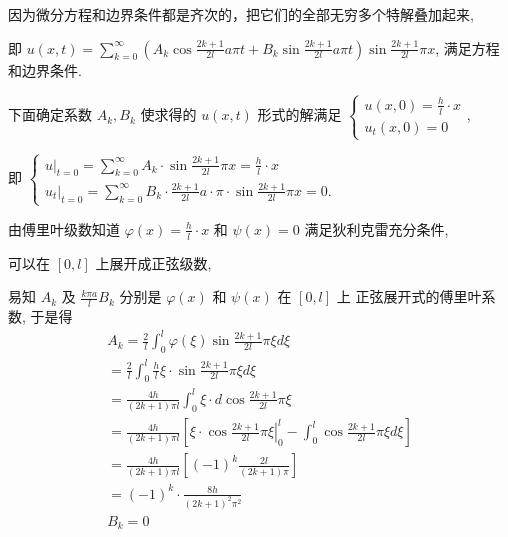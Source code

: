 \begin{questions}
\begin{solution}
因为微分方程和边界条件都是齐次的，把它们的全部无穷多个特解叠加起来,

即 $ u(x, t)=\sum\limits_{k=0}^{\infty}\left(A_{k} \cos \frac{2k+1}{2l} a \pi t+B_{k} \sin \frac{2 k+1}{2l} a \pi t\right) \sin \frac{2 k+1}{2l} \pi x $, 满足方程和边界条件.

下面确定系数 $ A_{k}, B_{k} $ 使求得的 $ u(x, t) $ 形式的解满足 $ \left\{\begin{array}{l}u \left(x,0\right)=\frac{h}{l}\cdot x \\
u_{t}\left( x,0 \right)=0\end{array}\right. $,

即 $ \left\{\begin{array}{l}\left.u\right|_{t=0}=\sum\limits_{k=0}^{\infty} A_{k} \cdot \sin \frac{2 k+1}{2 l} \pi x=\frac{h}{l} \cdot x \\ \left.u_{t}\right|_{t=0}=\sum\limits_{k=0}^{\infty} B_{k} \cdot \frac{2 k+1}{2 l} a \cdot \pi \cdot \sin \frac{2 k+1}{2 l} \pi x=0 .\end{array}\right.
$

由傅里叶级数知道
$ \varphi(x)=\frac{h}{l} \cdot x $ 和 $ \psi(x)=0 $ 满足狄利克雷充分条件, 

可以在 $ [0,l] $ 上展开成正弦级数, 

易知 $ A_{k} $ 及 $ \frac{k \pi a}{l} B_{k} $ 分别是 $ \varphi(x) $ 和 $ \psi(x) $ 在 $ [0,l] $ 上 正弦展开式的傅里叶系数, 
于是得
\renewcommand{\arraystretch}{1.3}
$$
\begin{array}{l} 
A_{k}=\frac{2}{l} \int_{0}^{l} \varphi(\xi) \sin \frac{2 k+1}{2 l} \pi \xi d \xi \\
=\frac{2}{l} \int_{0}^{l} \frac{h}{l} \xi \cdot \sin \frac{2 k+1}{2 l} \pi \xi d \xi \\
=\frac{4 h}{(2 k+1) \pi l} \int_{0}^{l} \xi \cdot d \cos \frac{2 k+1}{2 l} \pi \xi \\
=\frac{4 h}{(2 k+1) \pi l}\left[\left.\xi \cdot \cos \frac{2 k+1}{2 l} \pi \xi\right|_{0} ^{l}-\int_{0}^{l} \cos \frac{2 k+1}{2 l} \pi \xi d \xi\right] \\
=\frac{4 h}{(2 k+1) \pi l}\left[(-1)^{k} \frac{2 l}{(2 k+1) \pi}\right] \\
=(-1)^{k} \cdot \frac{8 h}{(2 k+1)^{2} \pi^{2}} \\ B_{k}=0 \\
\end{array}
$$


\end{solution}
\end{questions}
